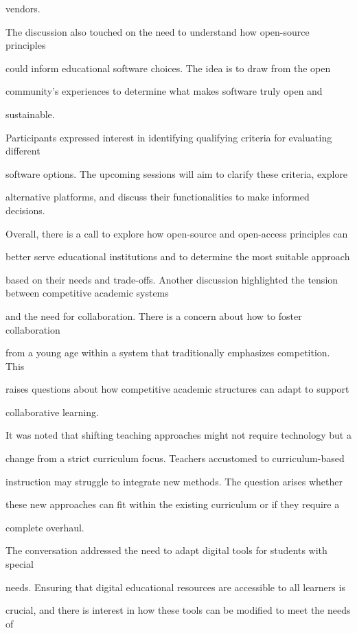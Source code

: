 \documentclass[11pt]{article}
\begin{document}
vendors.

The discussion also touched on the need to understand how open-source principles

could inform educational software choices. The idea is to draw from the open

community's experiences to determine what makes software truly open and

sustainable.

Participants expressed interest in identifying qualifying criteria for evaluating different

software options. The upcoming sessions will aim to clarify these criteria, explore

alternative platforms, and discuss their functionalities to make informed decisions.

Overall, there is a call to explore how open-source and open-access principles can

better serve educational institutions and to determine the most suitable approach

based on their needs and trade-offs. Another discussion highlighted the tension between competitive academic systems

and the need for collaboration. There is a concern about how to foster collaboration

from a young age within a system that traditionally emphasizes competition. This

raises questions about how competitive academic structures can adapt to support

collaborative learning.

It was noted that shifting teaching approaches might not require technology but a

change from a strict curriculum focus. Teachers accustomed to curriculum-based

instruction may struggle to integrate new methods. The question arises whether

these new approaches can fit within the existing curriculum or if they require a

complete overhaul.

The conversation addressed the need to adapt digital tools for students with special

needs. Ensuring that digital educational resources are accessible to all learners is

crucial, and there is interest in how these tools can be modified to meet the needs of
\end{document}
